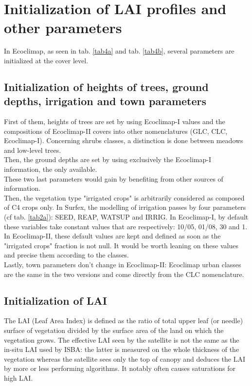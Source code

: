 \section{Initialization of LAI profiles and other parameters}

In Ecoclimap, as seen in tab. \ref{tab4a} and tab. \ref{tab4b}, several parameters are initialized at the cover level. 

\subsection{Initialization of heights of trees, ground depths, irrigation and town parameters}

First of them, heights of trees are set by using Ecoclimap-I values and the compositions of Ecoclimap-II covers 
into other nomenclatures (GLC, CLC, Ecoclimap-I). Concerning shrubs classes, a distinction is done between meadows 
and low-level trees.\\ 
Then, the ground depths are set by using exclusively the Ecoclimap-I information, the only available. \\
These two last parameters would gain by benefiting from other sources of information.\\ 
Then, the vegetation type "irrigated crops" is arbitrarily considered as composed of C4 crops only. 
In Surfex, the modelling of irrigation passes by four parameters (cf tab. \ref{tab2a}): SEED, REAP, WATSUP and IRRIG. In Ecoclimap-I, 
by default these variables take constant values that are respectively: 10/05, 01/08, 30 and 1. In Ecoclimap-II, these 
default values are kept and defined as soon as the "irrigated crops" fraction is not null. It would be worth leaning on these values 
and precise them according to the classes. \\
Lastly, town parameters don't change in Ecoclimap-II: Ecoclimap urban 
classes are the same in the two versions and come directly from the CLC nomenclature. 

\subsection{Initialization of LAI}

The LAI (Leaf Area Index) is defined as the ratio of total upper leaf (or needle) 
surface of vegetation divided by the surface area of the land on which the vegetation grows. The effective LAI seen by the satellite 
is not the same as the in-situ LAI used by ISBA: the latter is measured on the whole thickness of the vegetation whereas the satellite 
sees only the top of canopy and deduces the LAI by more or less performing algorithms. It notably often causes saturations 
for high LAI. 

